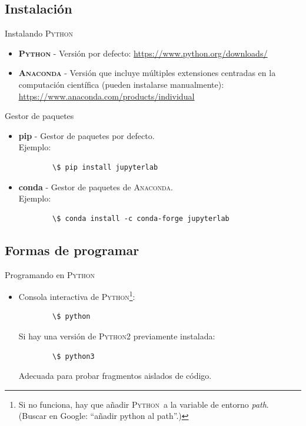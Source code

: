 \documentclass[10pt]{beamer} %
\newcommand{\py}{\textsc{Python}}
\begin{document}
\subsection{Instalación}
\begin{frame}{Instalando \py}
    \begin{itemize}
        \item \textbf{\py} - Versión por defecto: \underline{\url{https://www.python.org/downloads/}}
        \item \textbf{\textsc{Anaconda}} - Versión que incluye múltiples extensiones centradas en la computación científica (pueden instalarse manualmente): \underline{\url{https://www.anaconda.com/products/individual}}
    \end{itemize}
\end{frame}

\begin{frame}[fragile]{Gestor de paquetes}
    \begin{itemize}
        \item \textbf{pip} - Gestor de paquetes por defecto.\\
        Ejemplo:
        \begin{verbatim}
        \$ pip install jupyterlab
        \end{verbatim}
        \item \textbf{conda} - Gestor de paquetes de \textsc{Anaconda}.\\
        Ejemplo:
        \begin{verbatim}
        \$ conda install -c conda-forge jupyterlab
        \end{verbatim}
    \end{itemize}
\end{frame}

\subsection{Formas de programar}
\begin{frame}[fragile]{Programando en \py}
    \begin{itemize}
        \item Consola interactiva de \py\footnote{Si no funciona, hay que añadir \py\, a la variable de entorno \textit{path}.\\(Buscar en Google: ``añadir python al path''.)}:
        \begin{verbatim}
        \$ python
        \end{verbatim}
        Si hay una versión de \py2 previamente instalada:
        \begin{verbatim}
        \$ python3
        \end{verbatim}
        Adecuada para probar fragmentos aislados de código.
    \end{itemize}
\end{frame}
\end{document}
